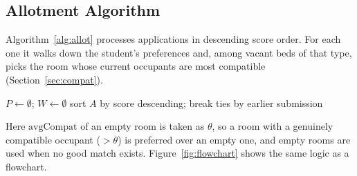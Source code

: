 \documentclass[11pt,a4paper]{report}
\begin{document}
\subsection{Allotment Algorithm}
Algorithm~\ref{alg:allot} processes applications in descending score order. For each one it walks down the student's preferences and, among vacant beds of that type, picks the room whose current occupants are most compatible (Section~\ref{sec:compat}).

\begin{algorithm}[H]
\caption{Smart room allotment}\label{alg:allot}
\small
{}
$P \leftarrow \emptyset$; $W \leftarrow \emptyset$\;
sort $A$ by score descending; break ties by earlier submission\;
\end{algorithm}

Here $\text{avgCompat}$ of an empty room is taken as $\theta$, so a room with a genuinely compatible occupant ($>\theta$) is preferred over an empty one, and empty rooms are used when no good match exists. Figure~\ref{fig:flowchart} shows the same logic as a flowchart.
\end{document}
